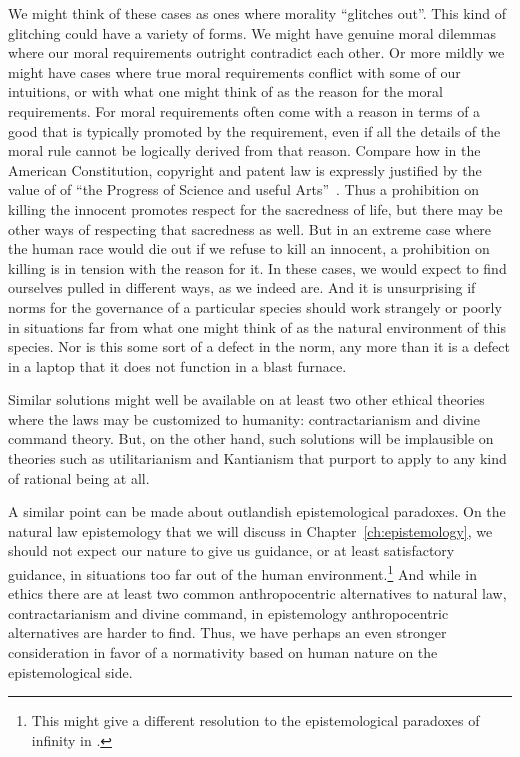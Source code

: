We might think of these cases as ones where morality ``glitches out''. This kind of glitching could have a variety
of forms. We might have genuine moral dilemmas where our moral requirements outright contradict each other. Or more
mildly we might have cases where true moral requirements conflict with some of our intuitions, or with what one might think of as the reason for the moral requirements. For moral requirements often come with a reason in terms of a good that
is typically promoted by the requirement, even if all the details of the moral rule cannot be logically derived from that reason. Compare how in the American Constitution, copyright and patent law is expressly justified by the value of  
of ``the Progress of Science and useful Arts''~\parencite[Sect.~8]{USConst}. Thus a prohibition on killing the innocent promotes respect for the sacredness of life,
but there may be other ways of respecting that sacredness as well. But in an extreme case where the human race would die out
if we refuse to kill an innocent, a prohibition on killing is in tension with the reason for it. In these cases, we would
expect to find ourselves pulled in different ways, as we indeed are. And it is unsurprising if norms for the governance of
a particular species should work strangely or poorly in situations far from what one might think of as the natural environment 
of this species. Nor is this some sort of a defect in the norm, any more than it is a defect in a laptop that it does not
function in a blast furnace.

Similar solutions might well be available on at least two other ethical theories where the laws may be customized
to humanity: contractarianism and divine command theory. But, on the other hand, such solutions will be
implausible on theories such as utilitarianism and Kantianism that purport to apply to any kind of rational being at all. 

A similar point can be made about outlandish epistemological paradoxes.
 On the natural law epistemology that we will discuss in Chapter~\ref{ch:epistemology}, we should not expect our nature to give us guidance, or at least satisfactory guidance, 
in situations too far out of the human environment.\footnote{This might give a different resolution
to the epistemological paradoxes of infinity in .}
 And while in ethics there are at least two common anthropocentric alternatives to natural law, contractarianism and divine command, in epistemology anthropocentric alternatives are harder to find.
Thus, we have perhaps an even stronger consideration in favor of a normativity based on human nature on the epistemological
side. 

